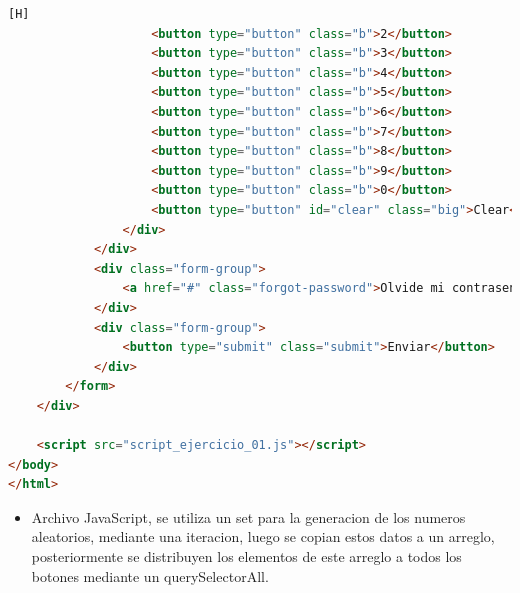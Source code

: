 \documentclass{article}
\begin{document}
\begin{lstlisting}[language=html,caption={Ejercicio1/index.html}][H]
                    <button type="button" class="b">2</button>
                    <button type="button" class="b">3</button>
                    <button type="button" class="b">4</button>
                    <button type="button" class="b">5</button>
                    <button type="button" class="b">6</button>
                    <button type="button" class="b">7</button>
                    <button type="button" class="b">8</button>
                    <button type="button" class="b">9</button>
                    <button type="button" class="b">0</button>
                    <button type="button" id="clear" class="big">Clear</button>
                </div>
            </div>
            <div class="form-group">
                <a href="#" class="forgot-password">Olvide mi contrasena</a>
            </div>
            <div class="form-group">
                <button type="submit" class="submit">Enviar</button>
            </div>
        </form>
    </div>

    <script src="script_ejercicio_01.js"></script>
</body>
</html>
	\end{lstlisting}
\begin{itemize}	
		\item Archivo JavaScript, se utiliza un set para la generacion de los numeros aleatorios, mediante una iteracion, luego se copian estos datos a un arreglo, posteriormente se distribuyen los elementos de este arreglo a todos los botones mediante un querySelectorAll.
	\end{itemize}	
		
\end{document}
